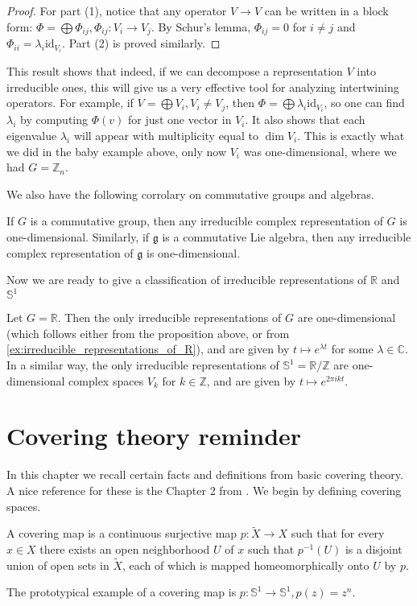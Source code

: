 \documentclass{report}
\begin{document}
\begin{proof}
For part (1), notice that any operator \( V \to V \) can be written in a block form: \( \Phi = \bigoplus \Phi_{ij}, \Phi_{ij} : V_i \to V_j \). By Schur's lemma, \( \Phi_{ij} = 0 \) for \( i \neq j \) and \( \Phi_{ii} = \lambda_i \mathrm{id}_{V_i} \). Part (2) is proved similarly.
\end{proof}

This result shows that indeed, if we can decompose a representation \( V \) into irreducible ones, this will give us a very effective tool for analyzing intertwining operators. For example, if \( V = \bigoplus V_i, V_i \neq V_j \), then \( \Phi = \bigoplus \lambda_i \mathrm{id}_{V_i} \), so one can find \( \lambda_i \) by computing \( \Phi(v) \) for just one vector in \( V_i \). It also shows that each eigenvalue \( \lambda_i \) will appear with multiplicity equal to \( \dim V_i \). This is exactly what we did in the baby example above, only now \( V_i \) was one-dimensional, where we had \( G = \mathbb{Z}_n \).

We also have the following corrolary on commutative groups and algebras.
\begin{proposition}
    If $G$ is a commutative group, then any irreducible complex
representation of $G$ is one-dimensional. Similarly, if $\mathfrak g$ is a commutative Lie algebra, then any irreducible complex representation of $\mathfrak g$ is one-dimensional.
\end{proposition}
Now we are ready to give a classification of irreducible representations of $\mathbb R$ and $\mathbb S^1$
\begin{example}\label{ex:irreducible_representations_of_R}
    Let $G = \mathbb R$.
    Then the only irreducible representations of $G$ are one-dimensional (which follows either from the proposition above, or from \cref{ex:irreducible_representations_of_R}), and are given by $t \mapsto e^{\lambda t} $ for some $\lambda \in \mathbb C$.
    In a similar way, the only irreducible representations of $\mathbb S^1 = \mathbb R/ \mathbb Z$ are one-dimensional complex spaces $V_k$ for $k \in \mathbb Z$, and are given by $t \mapsto e^{2\pi i k t}$.
\end{example}
\appendix

\chapter{Covering theory reminder}
In this chapter we recall certain facts and definitions from basic covering theory.
A nice reference for these is the Chapter 2 from \cite{hatcher2002topology}.
We begin by defining covering spaces.
\begin{definition}
    A covering map is a continuous surjective map $p: \tilde X \to X$ such that for every $x \in X$ there exists an open neighborhood $U$ of $x$ such that $p^{-1}(U)$ is a disjoint union of open sets in $\tilde X$, each of which is mapped homeomorphically onto $U$ by $p$.
\end{definition}
The prototypical example of a covering map is $p: \mathbb S^1 \to \mathbb S^1, p(z) = z^n$.
\end{document}
